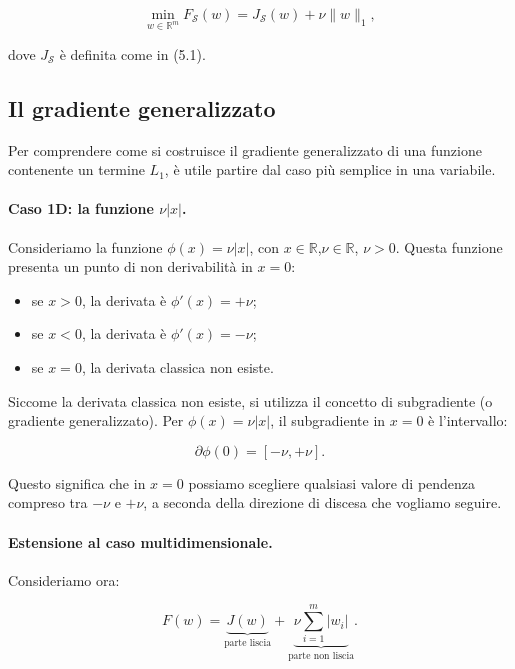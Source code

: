 \documentclass[italian, a4paper, twoside, binding=6mm]{sapthesis}
\begin{document}
\begin{equation}
\min_{w \in \mathbb{R}^m} F_{\mathcal{S}}(w) = J_{\mathcal{S}}(w) + \nu \|w\|_1, \tag{5.42}
\end{equation}

dove $J_{\mathcal{S}}$ è definita come in (5.1).

\subsection{Il gradiente generalizzato}

Per comprendere come si costruisce il gradiente generalizzato di una funzione
contenente un termine $L_1$, è utile partire dal caso più semplice in una variabile.

\paragraph{Caso 1D: la funzione $\nu|x|$.}

Consideriamo la funzione $\phi(x) = \nu |x|$, con $x\in\mathbb{R}$,\newline $\nu \in\mathbb{R}$, $\nu> 0$. Questa funzione
presenta un punto di non derivabilità in $x = 0$:

\begin{itemize}
    \item se $x > 0$, la derivata è $\phi'(x) = +\nu$;
    \item se $x < 0$, la derivata è $\phi'(x) = -\nu$;
    \item se $x = 0$, la derivata classica non esiste.
\end{itemize}

Siccome la derivata classica non esiste, si utilizza
il concetto di subgradiente (o gradiente generalizzato). Per
$\phi(x) = \nu|x|$, il subgradiente in $x = 0$ è l'intervallo:

\[
\partial \phi(0) = [-\nu, +\nu].
\]

Questo significa che in $x = 0$ possiamo scegliere qualsiasi valore di pendenza
compreso tra $-\nu$ e $+\nu$, a seconda della direzione di discesa che vogliamo
seguire.

\paragraph{Estensione al caso multidimensionale.}

Consideriamo ora:

\[
F(w) = \underbrace{J(w)}_{\text{parte liscia}} + \underbrace{\nu \sum_{i=1}^m |w_i|}_{\text{parte non liscia}}.
\]
\end{document}
